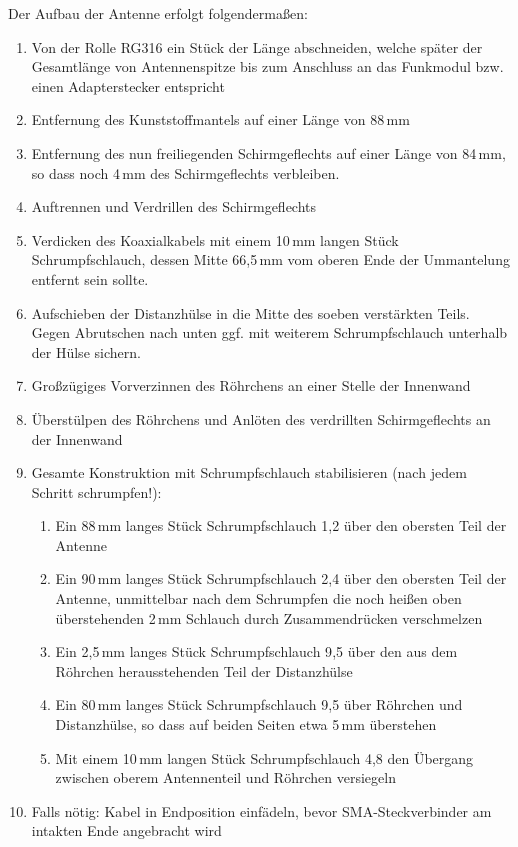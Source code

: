 \documentclass[pdftex, parskip, numbers=noenddot, toc=listof]{scrbook}
\begin{document}
			Der Aufbau der Antenne erfolgt folgendermaßen:
			\begin{enumerate}
				\item Von der Rolle RG316 ein Stück der Länge abschneiden, welche später der Gesamtlänge von Antennenspitze bis zum Anschluss an das Funkmodul bzw. einen Adapterstecker entspricht
				\item Entfernung des Kunststoffmantels auf einer Länge von 88\,mm
				\item Entfernung des nun freiliegenden Schirmgeflechts auf einer Länge von 84\,mm, so dass noch 4\,mm des Schirmgeflechts verbleiben.
				\item Auftrennen und Verdrillen des Schirmgeflechts
				\item Verdicken des Koaxialkabels mit einem 10\,mm langen Stück Schrumpfschlauch, dessen Mitte 66{,}5\,mm vom oberen Ende der Ummantelung entfernt sein sollte.
				\item Aufschieben der Distanzhülse in die Mitte des soeben verstärkten Teils. Gegen Abrutschen nach unten ggf. mit weiterem Schrumpfschlauch unterhalb der Hülse sichern.
				\item Großzügiges Vorverzinnen des Röhrchens an einer Stelle der Innenwand
				\item Überstülpen des Röhrchens und Anlöten des verdrillten Schirmgeflechts an der Innenwand
				\item Gesamte Konstruktion mit Schrumpfschlauch stabilisieren (nach jedem Schritt schrumpfen!):
				      \begin{enumerate}
				      	\item Ein 88\,mm langes Stück Schrumpfschlauch 1{,}2 über den obersten Teil der Antenne
				      	\item Ein 90\,mm langes Stück Schrumpfschlauch 2{,}4 über den obersten Teil der Antenne, unmittelbar nach dem Schrumpfen die noch heißen oben überstehenden 2\,mm Schlauch durch Zusammendrücken verschmelzen
				      	\item Ein 2{,}5\,mm langes Stück Schrumpfschlauch 9{,}5 über den aus dem Röhrchen herausstehenden Teil der Distanzhülse
				      	\item Ein 80\,mm langes Stück Schrumpfschlauch 9{,}5 über Röhrchen und Distanzhülse, so dass auf beiden Seiten etwa 5\,mm überstehen
				      	\item Mit einem 10\,mm langen Stück Schrumpfschlauch 4{,}8 den Übergang zwischen oberem Antennenteil und Röhrchen versiegeln
				      \end{enumerate}
				\item Falls nötig: Kabel in Endposition einfädeln, bevor SMA-Steckverbinder am intakten Ende angebracht wird
			\end{enumerate}
\end{document}
